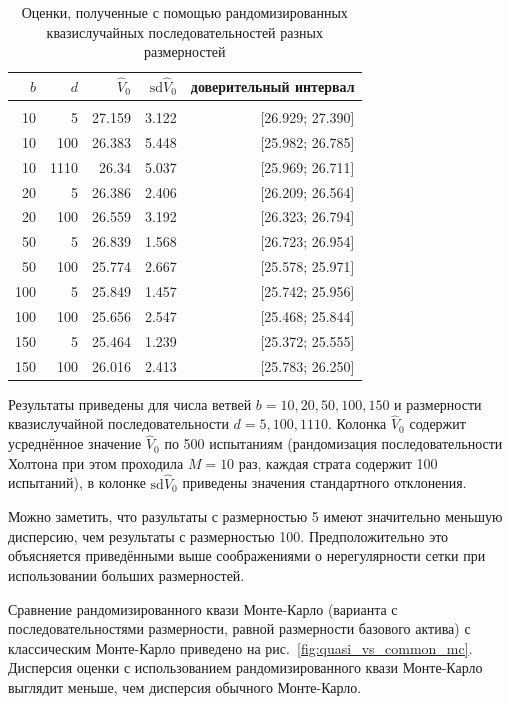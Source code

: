 \documentclass[specialist,
               substylefile = ../spbu.rtx,
               subf,href,colorlinks=true, 12pt]{disser}
\newcommand{\Vhat}{\hat{V}}
\begin{document}
\begin{table}
	\renewcommand{\arraystretch}{0.6}
	\centering
	\caption{Оценки, полученные с помощью рандомизированных квазислучайных последовательностей разных размерностей}
	\begin{tabular}{rrrrr}
		$b$&$d$&$\Vhat_0$&$\mathrm{sd}\Vhat_0$&доверительный интервал\\[5pt]\hline\\
		10&5&27.159&3.122&[26.929; 27.390]\\
		10&100&26.383&5.448&[25.982; 26.785]\\
		10&1110&26.34&5.037&[25.969; 26.711]\\[5pt]
		20&5&26.386&2.406&[26.209; 26.564]\\
		20&100&26.559&3.192&[26.323; 26.794]\\[5pt]
		50&5&26.839&1.568&[26.723; 26.954]\\
		50&100&25.774&2.667&[25.578; 25.971]\\[5pt]
		100&5&25.849&1.457&[25.742; 25.956]\\
		100&100&25.656&2.547&[25.468; 25.844]\\[5pt]
		150&5&25.464&1.239&[25.372; 25.555]\\
		150&100&26.016&2.413&[25.783; 26.250]\\[10pt]
	\end{tabular}
	\label{tbl:halton_estimators}

	\footnotesize
	Результаты приведены для числа ветвей $b = 10, 20, 50, 100, 150$ и размерности квазислучайной последовательности $d = 5, 100, 1110$. Колонка $\Vhat_0$ содержит усреднённое значение $\Vhat_0$ по 500 испытаниям (рандомизация последовательности Холтона при этом проходила $M = 10$ раз, каждая страта содержит 100 испытаний), в колонке $\mathrm{sd}\Vhat_0$ приведены значения стандартного отклонения.
\end{table}

Можно заметить, что разультаты с размерностью 5 имеют значительно меньшую дисперсию, чем результаты с размерностью 100. Предположительно это объясняется приведёнными выше соображениями о нерегулярности сетки при использовании больших размерностей.

Сравнение рандомизированного квази Монте-Карло (варианта с последовательностями размерности, равной размерности базового актива) с классическим Монте-Карло приведено на рис.~\ref{fig:quasi_vs_common_mc}. Дисперсия оценки с использованием рандомизированного квази Монте-Карло выглядит меньше, чем дисперсия обычного Монте-Карло. 
\end{document}

